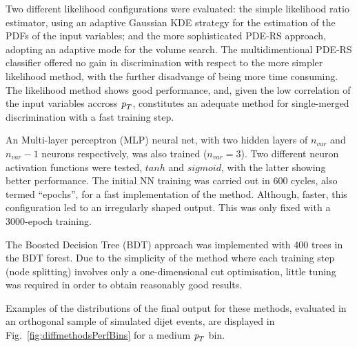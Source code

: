 
Two different likelihood configurations were evaluated: the simple likelihood ratio estimator,  using an adaptive Gaussian KDE strategy for the estimation of the PDFs of the input variables; and the more sophisticated PDE-RS approach, adopting an adaptive mode for the volume search.  The multidimentional PDE-RS classifier offered no gain in discrimination with respect to the more simpler likelihood method, with the further disadvange of being more time consuming.  The likelihood method shows good performance, and, given the low correlation of the input variables accross ${\emph{p}_{T}}$, constitutes an adequate method for single-merged discrimination with a fast training step.

An Multi-layer perceptron (MLP) neural net, with two hidden layers of $n_{var}$ and $n_{var}-1$ neurons respectively, was also trained ($n_{var}=3$).  Two different neuron activation functions were tested, $tanh$ and $sigmoid$, with the latter showing better performance.  The initial NN training was carried out in 600 cycles, also termed ``epochs'', for a fast implementation of the method. Although, faster, this configuration led to an irregularly shaped output. This was only fixed with a 3000-epoch training.  

The Boosted Decision Tree (BDT) approach was implemented with 400 trees in the BDT forest. Due to the simplicity of the method where each training step (node splitting) involves only a one-dimensional cut optimisation, little tuning was required in order to obtain reasonably good results.

Examples of the distributions of the final output for these methods, evaluated in an orthogonal sample of simulated dijet events, are displayed in Fig.~\ref{fig:diffmethodsPerfBins} for a medium ${\emph{p}_{T}}$ bin.  %

